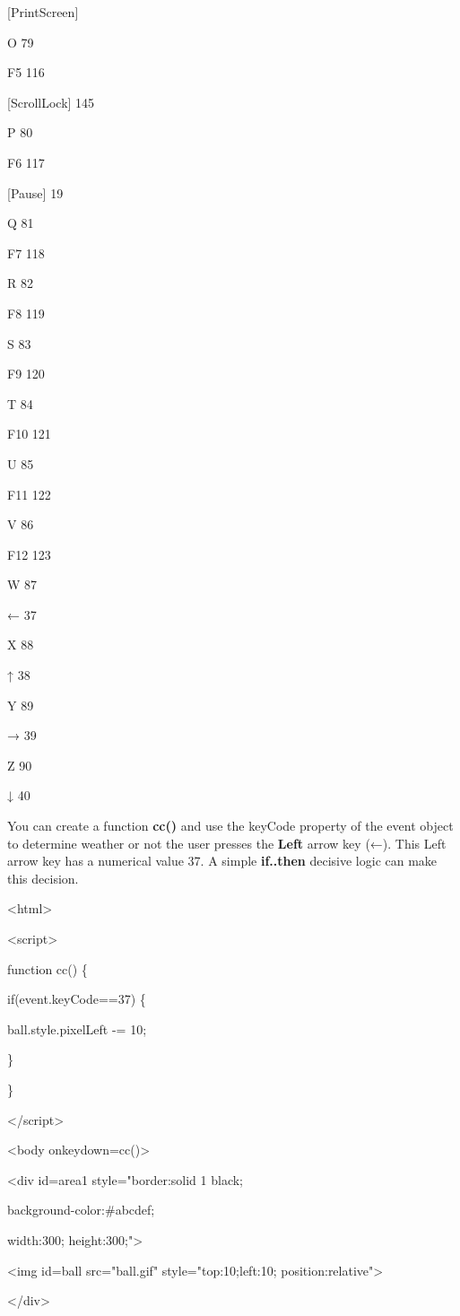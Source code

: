 \documentclass[
]{article}
\begin{document}
{[}PrintScreen{]}

O 79

F5 116

{[}ScrollLock{]} 145

P 80

F6 117

{[}Pause{]} 19

Q 81

F7 118

R 82

F8 119

S 83

F9 120

T 84

F10 121

U 85

F11 122

V 86

F12 123

W 87

← 37

X 88

↑ 38

Y 89

→ 39

Z 90

↓ 40

You can create a function \textbf{cc()} and use the keyCode property of
the event object to determine weather or not the user presses the
\textbf{Left} arrow key (←). This Left arrow key has a numerical value
37. A simple \textbf{if..then} decisive logic can make this decision.

\textless html\textgreater{}

\textless script\textgreater{}

function cc() \{

if(event.keyCode==37) \{

ball.style.pixelLeft -= 10;

\}

\}

\textless/script\textgreater{}

\textless body onkeydown=cc()\textgreater{}

\textless div id=area1 style="border:solid 1 black;

background-color:\#abcdef;

width:300; height:300;"\textgreater{}

\textless img id=ball src="ball.gif" style="top:10;left:10;
position:relative"\textgreater{}

\textless/div\textgreater{}
\end{document}
